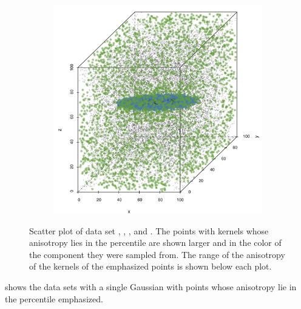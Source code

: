 \begin{figure}
\begin{subfigure}{0.23\textwidth}
					\caption{}
					\label{fig:discussion:anisotropy:baakman4}
				\end{subfigure}		
				\begin{subfigure}{0.23\textwidth}
					\centering
					\includegraphics[keepaspectratio=true, width=\textwidth, height=0.23\textheight]{discussion/img/baakman_5_60000_anisotropy.png}
					\caption{}
					\label{fig:discussion:anisotropy:baakman5}
				\end{subfigure}			
				\caption{Scatter plot of data set
					 \ferdosiOne, %
					 \baakmanOne, %
					 \baakmanFour, and %
					 \baakmanFive. %
					The points with kernels whose anisotropy lies in the  percentile are shown larger and in the color of the component they were sampled from. The range of the anisotropy of the kernels of the emphasized points is shown below each plot.}
				\label{fig:discussion:anisotropy:singleSphere}
			\end{figure}
			 shows the data sets with a single Gaussian with points whose anisotropy lie in the  percentile emphasized. 

